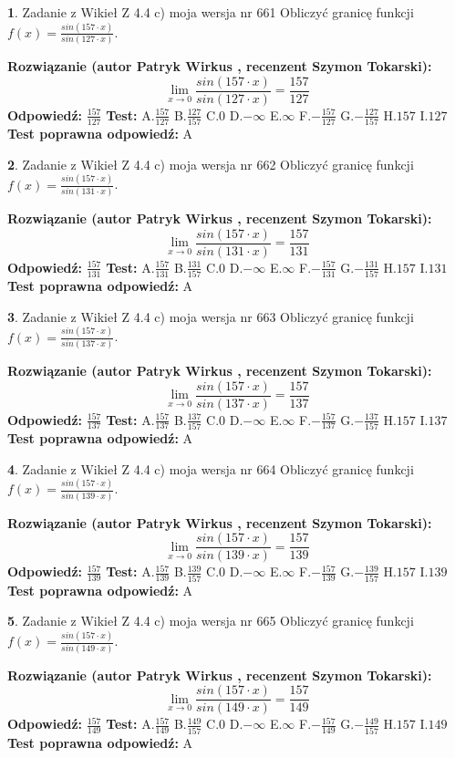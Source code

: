 \documentclass[12pt, a4paper]{article}
\theoremstyle{definition} %
\newtheorem{zad}{}
\newcommand{\zadStart}[1]{\begin{zad}#1\newline}
\newcommand{\zadStop}{\end{zad}}
\newcommand{\rozwStart}[2]{\noindent \textbf{Rozwiązanie (autor #1 , recenzent #2): }\newline}
\newcommand{\rozwStop}{\newline}
\newcommand{\odpStart}{\noindent \textbf{Odpowiedź:}\newline}
\newcommand{\odpStop}{\newline}
\newcommand{\testStart}{\noindent \textbf{Test:}\newline}
\newcommand{\testStop}{\newline}
\newcommand{\kluczStart}{\noindent \textbf{Test poprawna odpowiedź:}\newline}
\newcommand{\kluczStop}{\newline}
\begin{document}
\zadStart{Zadanie z Wikieł Z 4.4 c) moja wersja nr 661}
Obliczyć granicę funkcji $f(x)=\frac{sin(157\cdot x)}{sin(127\cdot x)}$.
\zadStop
\rozwStart{Patryk Wirkus}{Szymon Tokarski}
$$\lim\limits_{x\to 0}\frac{sin(157\cdot x)}{sin(127\cdot x)}=
\frac{157}{127}$$
\rozwStop
\odpStart
$\frac{157}{127}$
\odpStop
\testStart
A.$\frac{157}{127}$
B.$\frac{127}{157}$
C.$0$
D.$-\infty$
E.$\infty$
F.$-\frac{157}{127}$
G.$-\frac{127}{157}$
H.$157$
I.$127$
\testStop
\kluczStart
A
\kluczStop



\zadStart{Zadanie z Wikieł Z 4.4 c) moja wersja nr 662}
Obliczyć granicę funkcji $f(x)=\frac{sin(157\cdot x)}{sin(131\cdot x)}$.
\zadStop
\rozwStart{Patryk Wirkus}{Szymon Tokarski}
$$\lim\limits_{x\to 0}\frac{sin(157\cdot x)}{sin(131\cdot x)}=
\frac{157}{131}$$
\rozwStop
\odpStart
$\frac{157}{131}$
\odpStop
\testStart
A.$\frac{157}{131}$
B.$\frac{131}{157}$
C.$0$
D.$-\infty$
E.$\infty$
F.$-\frac{157}{131}$
G.$-\frac{131}{157}$
H.$157$
I.$131$
\testStop
\kluczStart
A
\kluczStop



\zadStart{Zadanie z Wikieł Z 4.4 c) moja wersja nr 663}
Obliczyć granicę funkcji $f(x)=\frac{sin(157\cdot x)}{sin(137\cdot x)}$.
\zadStop
\rozwStart{Patryk Wirkus}{Szymon Tokarski}
$$\lim\limits_{x\to 0}\frac{sin(157\cdot x)}{sin(137\cdot x)}=
\frac{157}{137}$$
\rozwStop
\odpStart
$\frac{157}{137}$
\odpStop
\testStart
A.$\frac{157}{137}$
B.$\frac{137}{157}$
C.$0$
D.$-\infty$
E.$\infty$
F.$-\frac{157}{137}$
G.$-\frac{137}{157}$
H.$157$
I.$137$
\testStop
\kluczStart
A
\kluczStop



\zadStart{Zadanie z Wikieł Z 4.4 c) moja wersja nr 664}
Obliczyć granicę funkcji $f(x)=\frac{sin(157\cdot x)}{sin(139\cdot x)}$.
\zadStop
\rozwStart{Patryk Wirkus}{Szymon Tokarski}
$$\lim\limits_{x\to 0}\frac{sin(157\cdot x)}{sin(139\cdot x)}=
\frac{157}{139}$$
\rozwStop
\odpStart
$\frac{157}{139}$
\odpStop
\testStart
A.$\frac{157}{139}$
B.$\frac{139}{157}$
C.$0$
D.$-\infty$
E.$\infty$
F.$-\frac{157}{139}$
G.$-\frac{139}{157}$
H.$157$
I.$139$
\testStop
\kluczStart
A
\kluczStop



\zadStart{Zadanie z Wikieł Z 4.4 c) moja wersja nr 665}
Obliczyć granicę funkcji $f(x)=\frac{sin(157\cdot x)}{sin(149\cdot x)}$.
\zadStop
\rozwStart{Patryk Wirkus}{Szymon Tokarski}
$$\lim\limits_{x\to 0}\frac{sin(157\cdot x)}{sin(149\cdot x)}=
\frac{157}{149}$$
\rozwStop
\odpStart
$\frac{157}{149}$
\odpStop
\testStart
A.$\frac{157}{149}$
B.$\frac{149}{157}$
C.$0$
D.$-\infty$
E.$\infty$
F.$-\frac{157}{149}$
G.$-\frac{149}{157}$
H.$157$
I.$149$
\testStop
\kluczStart
A
\kluczStop
\end{document}
